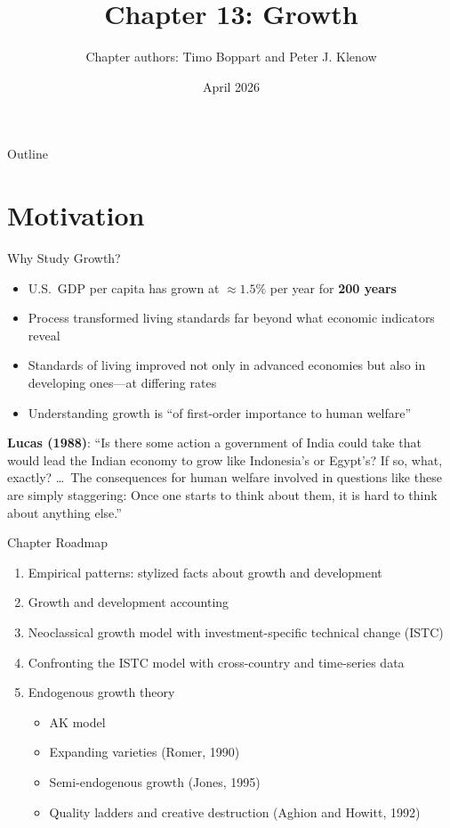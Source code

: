 \documentclass[blue]{beamer}
\title[Chapter13]{Chapter 13: Growth}
\author[Timo Boppart and Peter J. Klenow]{Chapter authors: Timo Boppart and Peter J. Klenow}
\date[April 2026]{April 2026}
\begin{document}
  \frame
  {
    \titlepage
  }


\begin{frame}{Outline}
	\tableofcontents
\end{frame}

\section{Motivation}

\begin{frame}{Why Study Growth?}
	\begin{itemize}
		\item U.S.\ GDP per capita has grown at $\approx 1.5\%$ per year for \textbf{200 years}
		\item Process transformed living standards far beyond what economic indicators reveal
		\item Standards of living improved not only in advanced economies but also in developing ones---at differing rates
		\item Understanding growth is ``of first-order importance to human welfare''
	\end{itemize}
	
	\medskip
	\textbf{Lucas (1988)}: ``Is there some action a government of India could take that would lead the Indian economy to grow like Indonesia's or Egypt's? If so, what, exactly? \ldots\ The consequences for human welfare involved in questions like these are simply staggering: Once one starts to think about them, it is hard to think about anything else.''
\end{frame}


\begin{frame}{Chapter Roadmap}
	\begin{enumerate}
		\item Empirical patterns: stylized facts about growth and development
		\item Growth and development accounting
		\item Neoclassical growth model with investment-specific technical change (ISTC)
		\item Confronting the ISTC model with cross-country and time-series data
		\item Endogenous growth theory
		\begin{itemize}
			\item AK model
			\item Expanding varieties (Romer, 1990)
			\item Semi-endogenous growth (Jones, 1995)
			\item Quality ladders and creative destruction (Aghion and Howitt, 1992)
		\end{itemize}
	\end{enumerate}
\end{frame}
\end{document}
